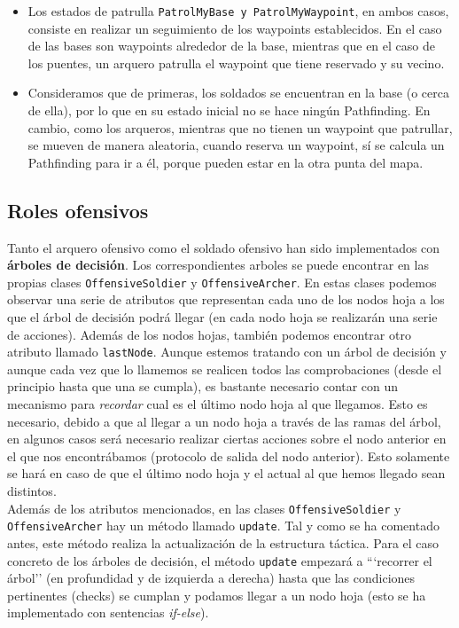 \begin{itemize}
 \item Los estados de patrulla \texttt{PatrolMyBase y PatrolMyWaypoint}, en ambos casos, consiste en realizar un seguimiento de los waypoints establecidos. En el caso de las bases son waypoints alrededor de la base, mientras que en el caso de los puentes, un arquero patrulla el waypoint que tiene reservado y su vecino.
 
 \item Consideramos que de primeras, los soldados se encuentran en la base (o cerca de ella), por lo que en su estado inicial no se hace ningún Pathfinding. En cambio, como los arqueros, mientras que no tienen un waypoint que patrullar, se mueven de manera aleatoria, cuando reserva un waypoint, sí se calcula un Pathfinding para ir a él, porque pueden estar en la otra punta del mapa.
\end{itemize}


\medskip
\subsection{Roles ofensivos}
Tanto el arquero ofensivo como el soldado ofensivo han sido implementados con \textbf{árboles de decisión}. Los correspondientes arboles se puede encontrar en las propias clases \texttt{OffensiveSoldier} y \texttt{OffensiveArcher}. En estas clases podemos observar una serie de atributos que representan cada uno de los nodos hoja a los que el árbol de decisión podrá llegar (en cada nodo hoja se realizarán una serie de acciones). Además de los nodos hojas, también podemos encontrar otro atributo llamado \texttt{lastNode}. Aunque estemos tratando con un árbol de decisión y aunque cada vez que lo llamemos se realicen todos las comprobaciones (desde el principio hasta que una se cumpla), es bastante necesario contar con un mecanismo para \textit{recordar} cual es el último nodo hoja al que llegamos. Esto es necesario, debido a que al llegar a un nodo hoja a través de las ramas del árbol, en algunos casos será necesario realizar ciertas acciones sobre el nodo anterior en el que nos encontrábamos (protocolo de salida del nodo anterior). Esto solamente se hará en caso de que el último nodo hoja y el actual al que hemos llegado sean distintos. \\

Además de los atributos mencionados, en las clases \texttt{OffensiveSoldier} y \texttt{OffensiveArcher} hay un método llamado \texttt{update}. Tal y como se ha comentado antes, este método realiza la actualización de la estructura táctica. Para el caso concreto de los árboles de decisión, el método \texttt{update} empezará a ```recorrer el árbol'' (en profundidad y de izquierda a derecha) hasta que las condiciones pertinentes (checks) se cumplan y podamos llegar a un nodo hoja (esto se ha implementado con sentencias \textit{if-else}). \\

